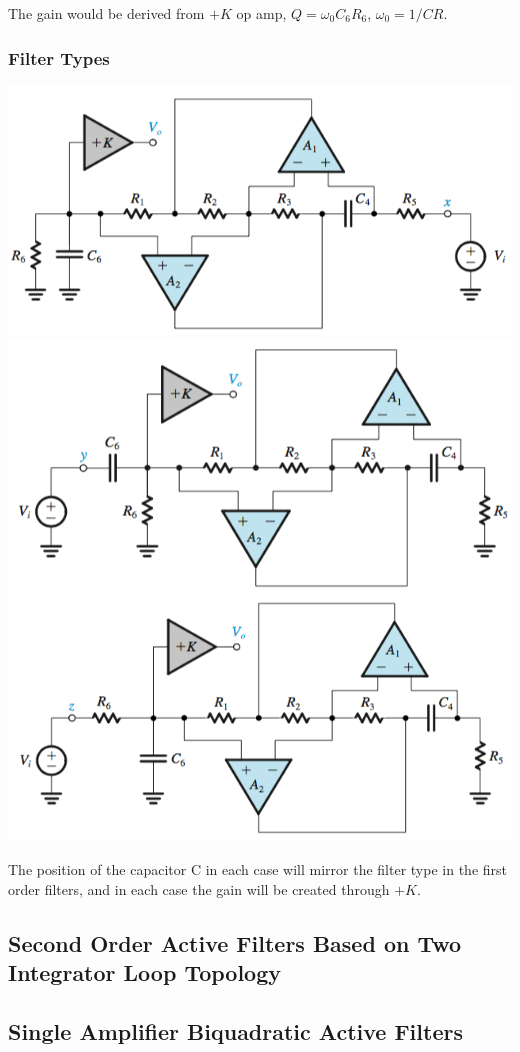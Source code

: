 \documentclass[11pt]{article}
\begin{document}
    The gain would be derived from $+K$ op amp, $Q = \omega_0C_6R_6$, $\omega_0 = 1/CR$.

    \subsubsection{Filter Types}
    \begin{center}
    \includegraphics[width=300 px]{lp-antoniou} \\ 

    \includegraphics[width=300 px]{hp-antoniou} \\ 
    
    \includegraphics[width=300 px]{bp-antoniou}
    \end{center}

    The position of the capacitor C in each case will mirror the filter type in the first order filters, and in each case the gain will be created through $+K$.
    
    \subsection{Second Order Active Filters Based on Two Integrator Loop Topology}
    \subsection{Single Amplifier Biquadratic Active Filters}
\end{document}
